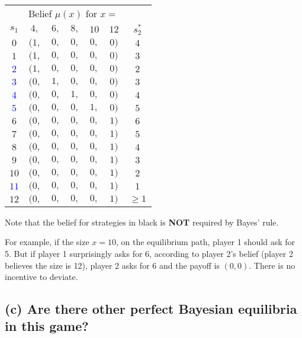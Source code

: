 \documentclass{article}
\begin{document}
\begin{mdframed}[backgroundcolor=blue!20,linecolor=white]
\begin{center}
\begin{tabular}{|c|ccccc|c|}
\multicolumn{1}{c}{} & \multicolumn{6}{c}{Belief $\mu(x)$ for $x = \quad  \quad  \quad$}  \\
$s_1$ & $4,$ & $6,$ & $8,$ & $10$ & $12$ & $s_2^*$  \\   \cline{1-7}
$0$ & $(1,$ & $0,$ & $0,$ & $0,$ & $0)$ & $4$ \\   
$1$ & $(1,$ & $0,$ & $0,$ & $0,$ & $0)$ & $3$ \\    \hline 
\textcolor{blue}{$2$} & $(1,$ & $0,$ & $0,$ & $0,$ & $0)$ & $2$ \\   
\textcolor{blue}{$3$} & $(0,$ & $1,$ & $0,$ & $0,$ & $0)$ & $3$ \\   
\textcolor{blue}{$4$} & $(0,$ & $0,$ & $1,$ & $0,$ & $0)$ & $4$ \\   
\textcolor{blue}{$5$} & $(0,$ & $0,$ & $0,$ & $1,$ & $0)$ & $5$ \\  \hline  
$6$ & $(0,$ & $0,$ & $0,$ & $0,$ & $1)$ & $6$ \\   
$7$ & $(0,$ & $0,$ & $0,$ & $0,$ & $1)$ & $5$ \\   
$8$ & $(0,$ & $0,$ & $0,$ & $0,$ & $1)$ & $4$ \\   
$9$ & $(0,$ & $0,$ & $0,$ & $0,$ & $1)$ & $3$ \\   
$10$& $(0,$ & $0,$ & $0,$ & $0,$ & $1)$ & $2$ \\  \hline    
\textcolor{blue}{$11$}& $(0,$ & $0,$ & $0,$ & $0,$ & $1)$ & $1$ \\ \hline 
$12$ & $(0,$ & $0,$ & $0,$ & $0,$ & $1)$ & $\ge 1$ \\   
\end{tabular}
\end{center}

Note that the belief for strategies in black is \textbf{NOT} required by Bayes' rule.

\medskip

For example, if the size $x=10$, on the equilibrium path, player 1 should ask for
5. But if player 1 surprisingly asks for 6, according to player 2's belief (player 2 
believes the size is 12), player 2 asks for 6 and the payoff is $(0,0)$. There is no incentive to deviate.
\end{mdframed}

\subsection*{(c) Are there other perfect Bayesian equilibria in this game?} %
\end{document}
